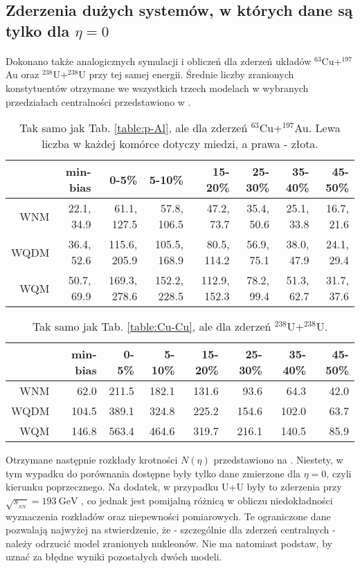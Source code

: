 \documentclass[a4paper,12pt]{article}
\begin{document}
\subsection{Zderzenia dużych systemów, w których dane są tylko dla $\eta = 0$}
\paragraph{}
Dokonano także analogicznych symulacji i obliczeń dla zderzeń układów $^{63}$Cu+$^{197}$Au oraz $^{238}$U+$^{238}$U przy tej samej energii. Średnie liczby zranionych konstytuentów otrzymane we wszystkich trzech modelach w wybranych przedziałach centralności przedstawiono w .

\begin{table}[H]\centering
\begin{tabular}{|r|r|r|r|r|r|r|r|} \hline
& min-bias & 0-5\% & 5-10\% & 15-20\% & 25-30\% & 35-40\% & 45-50\% \\ \hline
WNM  & 22.1, 34.9 & 61.1, 127.5 & 57.8, 106.5 & 47.2, 73.7 & 35.4, 50.6 & 25.1, 33.8 & 16.7, 21.6 \\ \hline
WQDM & 36.4, 52.6 & 115.6, 205.9 & 105.5, 168.9 & 80.5, 114.2 & 56.9, 75.1 & 38.0, 47.9 & 24.1, 29.4 \\ \hline
WQM  & 50.7, 69.9 & 169.3, 278.6 & 152.2, 228.5 & 112.9, 152.3 & 78.2, 99.4 & 51.3, 62.7 & 31.7, 37.6 \\ \hline
\end{tabular}
\caption{Tak samo jak Tab. \ref{table:p-Al}, ale dla zderzeń $^{63}$Cu+$^{197}$Au. Lewa liczba w każdej komórce dotyczy miedzi, a prawa -  złota.}\label{table:Cu-Au}
\end{table}
\begin{table}[H]\centering
\begin{tabular}{|r|r|r|r|r|r|r|r|} \hline
& min-bias & 0-5\% & 5-10\% & 15-20\% & 25-30\% & 35-40\% & 45-50\% \\ \hline
WNM  & 62.0 & 211.5 & 182.1 & 131.6 & 93.6 & 64.3 & 42.0 \\ \hline
WQDM & 104.5 & 389.1 & 324.8 & 225.2 & 154.6 & 102.0 & 63.7 \\ \hline
WQM  & 146.8 & 563.4 & 464.6 & 319.7 & 216.1 & 140.5 & 85.9 \\ \hline
\end{tabular}
\caption{Tak samo jak Tab. \ref{table:Cu-Cu}, ale dla zderzeń $^{238}$U+$^{238}$U.}\label{table:U-U}
\end{table}
Otrzymane następnie rozkłady krotności $N(\eta)$ przedstawiono na . Niestety, w tym wypadku do porównania dostępne były tylko dane zmierzone dla $\eta = 0$, czyli kierunku poprzecznego. Na dodatek, w przypadku U+U były to zderzenia przy $\sqrt{s_{_{NN}}} = 193~\text{GeV}$ \cite{Adare:2015bua}, co jednak jest pomijalną różnicą w obliczu niedokładności wyznaczenia rozkładów oraz niepewności pomiarowych. Te ograniczone dane pozwalają najwyżej na stwierdzenie, że - szczególnie dla zderzeń centralnych - należy odrzucić model zranionych nukleonów. Nie ma natomiast podstaw, by uznać za błędne wyniki pozostałych dwóch modeli.
\end{document}
